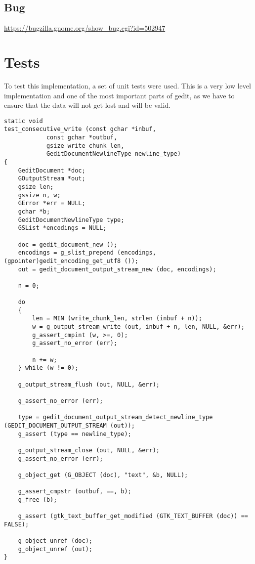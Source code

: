 \subsection{Bug}

\noindent\url{https://bugzilla.gnome.org/show_bug.cgi?id=502947}

\section{Tests}

To test this implementation, a set of unit tests were used. This is a very low level implementation and one of the most important parts of gedit, as we have to ensure that the data will not get lost and will be valid.

\begin{lstlisting}[style=GObject]
static void
test_consecutive_write (const gchar *inbuf,
			const gchar *outbuf,
			gsize write_chunk_len,
			GeditDocumentNewlineType newline_type)
{
	GeditDocument *doc;
	GOutputStream *out;
	gsize len;
	gssize n, w;
	GError *err = NULL;
	gchar *b;
	GeditDocumentNewlineType type;
	GSList *encodings = NULL;

	doc = gedit_document_new ();
	encodings = g_slist_prepend (encodings, (gpointer)gedit_encoding_get_utf8 ());
	out = gedit_document_output_stream_new (doc, encodings);

	n = 0;

	do
	{
		len = MIN (write_chunk_len, strlen (inbuf + n));
		w = g_output_stream_write (out, inbuf + n, len, NULL, &err);
		g_assert_cmpint (w, >=, 0);
		g_assert_no_error (err);

		n += w;
	} while (w != 0);

	g_output_stream_flush (out, NULL, &err);

	g_assert_no_error (err);

	type = gedit_document_output_stream_detect_newline_type (GEDIT_DOCUMENT_OUTPUT_STREAM (out));
	g_assert (type == newline_type);

	g_output_stream_close (out, NULL, &err);
	g_assert_no_error (err);

	g_object_get (G_OBJECT (doc), "text", &b, NULL);

	g_assert_cmpstr (outbuf, ==, b);
	g_free (b);

	g_assert (gtk_text_buffer_get_modified (GTK_TEXT_BUFFER (doc)) == FALSE);

	g_object_unref (doc);
	g_object_unref (out);
}


\end{lstlisting}
